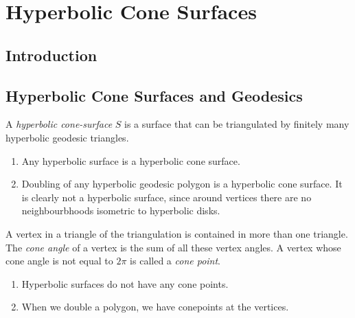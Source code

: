 
\chapter{Hyperbolic Cone Surfaces}  %
\section{Introduction}


\section{Hyperbolic Cone Surfaces and Geodesics}

\begin{defn} \label{ConeSurface}
	A \textit{hyperbolic cone-surface} $S$ is a surface that can be triangulated by finitely many hyperbolic geodesic triangles.
\end{defn}

\begin{exmp} \leavevmode
	\begin{enumerate}
		\item Any hyperbolic surface is a hyperbolic cone surface.
		\item Doubling of any hyperbolic geodesic polygon is a hyperbolic cone surface. It is clearly not a hyperbolic surface, since around vertices there are no neighbourbhoods isometric to hyperbolic disks.
	\end{enumerate}
\end{exmp}

\begin{defn} \label{ConePoint}
	A vertex in a triangle of the triangulation is contained in more than one triangle. The \textit{cone angle} of a vertex is the sum of all these vertex angles. A vertex whose cone angle is not equal to $2 \pi$ is called a \textit{cone point}. 
\end{defn}

\begin{exmp}\leavevmode
	\begin{enumerate}
		\item Hyperbolic surfaces do not have any cone points.
		\item When we double a polygon, we have conepoints at the vertices.
	\end{enumerate}
\end{exmp}

